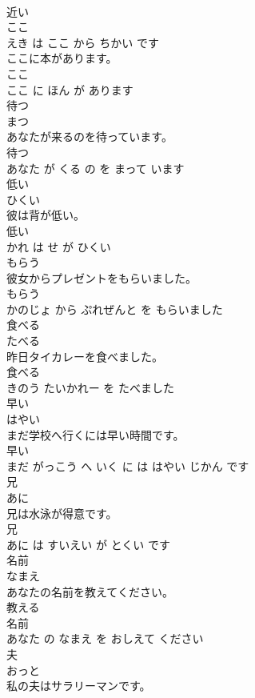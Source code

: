 \documentclass[8pt]{extreport}
\begin{document}
\begin{CJK}{UTF8}{min}
\\	近い 
\\	ここ 
\\	えき は ここ から ちかい です			
\\	ここに本があります。	
\\	ここ 
\\	ここ に ほん が あります			
\\	待つ	
\\	まつ			
\\	あなたが来るのを待っています。	
\\	待つ 
\\	あなた が くる の を まって います			
\\	低い	
\\	ひくい			
\\	彼は背が低い。	
\\	低い 
\\	かれ は せ が ひくい			
\\	もらう	
\\	彼女からプレゼントをもらいました。	
\\	もらう 
\\	かのじょ から ぷれぜんと を もらいました			
\\	食べる	
\\	たべる			
\\	昨日タイカレーを食べました。	
\\	食べる 
\\	きのう たいかれー を たべました			
\\	早い	
\\	はやい			
\\	まだ学校へ行くには早い時間です。	
\\	早い 
\\	まだ がっこう へ いく に は はやい じかん です			
\\	兄	
\\	あに			
\\	兄は水泳が得意です。	
\\	兄 
\\	あに は すいえい が とくい です			
\\	名前	
\\	なまえ			
\\	あなたの名前を教えてください。	
\\	教える 
\\	名前 
\\	あなた の なまえ を おしえて ください			
\\	夫	
\\	おっと			
\\	私の夫はサラリーマンです。	

\end{CJK}
\end{document}
